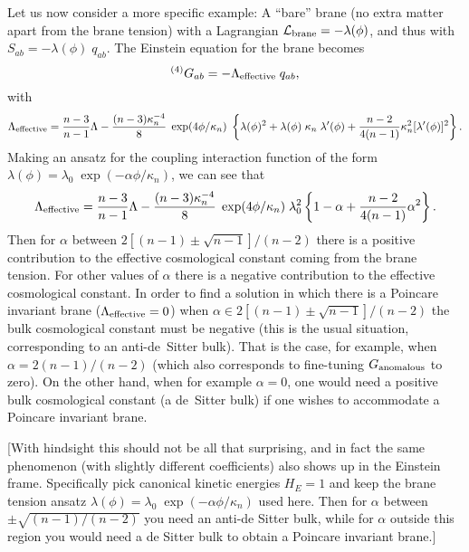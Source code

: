 \documentclass[a4paper,10pt]{article}
\begin{document}
{Let us now consider a more specific example: A ``bare'' brane (no
extra matter apart from the brane tension) with a Lagrangian
${\mathcal L}_{\mathrm{brane}}=- \lambda(\phi)$, and thus with $S_{ab}=-\lambda(\phi) \;
q_{ab}$.  The Einstein equation for the brane becomes
% 
\begin{equation}
{}^{(4)}G_{ab}=-\Lambda_{\mathrm{effective}} \; q_{ab},
\end{equation}
% 
with 
% 
\begin{equation}
\Lambda_{{\mathrm{effective}}}=
{n-3 \over n-1} \Lambda -
{(n-3)\kappa_n^{-4}\over8} \; \exp(4\phi/\kappa_n) \;
\left\{
\lambda(\phi)^2+ 
\lambda(\phi)\;\kappa_n\;\lambda'(\phi)+ 
{n-2\over 4(n-1)} \kappa_n^2 [\lambda'(\phi)]^2   
\right\}.
\end{equation}
% 
Making an ansatz for the coupling interaction function of the form
$\lambda(\phi) = \lambda_0\;\exp(-\alpha\phi/\kappa_n)$, we can see
that 
% 
\begin{equation}
\Lambda_{{\mathrm{effective}}}=
{n-3 \over n-1} \Lambda -
{(n-3)\kappa_n^{-4}\over8} \; \exp(4\phi/\kappa_n) \; \lambda_0^2
\left\{
1 - \alpha + {n-2\over 4(n-1)} \alpha^2  
\right\}.
\end{equation}
% 
Then for $\alpha$ between $2[(n-1)\pm\sqrt{n-1}]/(n-2)$ there is a
positive contribution to the effective cosmological constant coming
from the brane tension. For other values of $\alpha$ there is a
negative contribution to the effective cosmological constant. In order
to find a solution in which there is a Poincare invariant brane
($\Lambda_{{\mathrm{effective}}}=0$) when $\alpha\in
2[(n-1)\pm\sqrt{n-1}]/(n-2)$ the bulk cosmological constant must be
negative (this is the usual situation, corresponding to an
anti-de~Sitter bulk).  That is the case, for example, when
$\alpha=2(n-1)/(n-2)$ (which also corresponds to fine-tuning
$G_{\mathrm{anomalous}}$ to zero). On the other hand, when for example
$\alpha=0$, one would need a positive bulk cosmological constant (a
de~Sitter bulk) if one wishes to accommodate a Poincare invariant
brane.

[With hindsight this should not be all that surprising, and in fact
the same phenomenon (with slightly different coefficients) also shows
up in the Einstein frame. Specifically pick canonical kinetic energies
$H_E=1$ and keep the brane tension ansatz $\lambda(\phi) =
\lambda_0\;\exp(-\alpha\phi/\kappa_n)$ used here. Then for $\alpha$ between
$\pm\sqrt{(n-1)/(n-2)}$ you need an anti-de Sitter bulk, while for
$\alpha$ outside this region you would need a de Sitter bulk to obtain
a Poincare invariant brane.]



}
\end{document}
